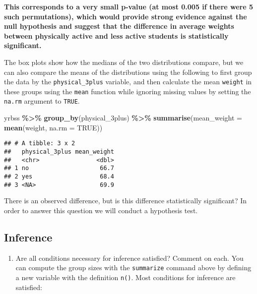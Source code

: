 \documentclass[
]{article}
\newenvironment{Shaded}{\begin{snugshade}}{\end{snugshade}}
\newcommand{\AttributeTok}[1]{\textcolor[rgb]{0.13,0.29,0.53}{#1}}
\newcommand{\ConstantTok}[1]{\textcolor[rgb]{0.56,0.35,0.01}{#1}}
\newcommand{\FunctionTok}[1]{\textcolor[rgb]{0.13,0.29,0.53}{\textbf{#1}}}
\newcommand{\NormalTok}[1]{#1}
\newcommand{\SpecialCharTok}[1]{\textcolor[rgb]{0.81,0.36,0.00}{\textbf{#1}}}
\providecommand{\tightlist}{%
  \setlength{\itemsep}{0pt}\setlength{\parskip}{0pt}}
\begin{document}
\textbf{This corresponds to a very small p-value (at most 0.005 if there
were 5 such permutations), which would provide strong evidence against
the null hypothesis and suggest that the difference in average weights
between physically active and less active students is statistically
significant.}

The box plots show how the medians of the two distributions compare, but
we can also compare the means of the distributions using the following
to first group the data by the \texttt{physical\_3plus} variable, and
then calculate the mean \texttt{weight} in these groups using the
\texttt{mean} function while ignoring missing values by setting the
\texttt{na.rm} argument to \texttt{TRUE}.

\begin{Shaded}
\begin{Highlighting}[]
\NormalTok{yrbss }\SpecialCharTok{\%\textgreater{}\%}
  \FunctionTok{group\_by}\NormalTok{(physical\_3plus) }\SpecialCharTok{\%\textgreater{}\%}
  \FunctionTok{summarise}\NormalTok{(}\AttributeTok{mean\_weight =} \FunctionTok{mean}\NormalTok{(weight, }\AttributeTok{na.rm =} \ConstantTok{TRUE}\NormalTok{))}
\end{Highlighting}
\end{Shaded}

\begin{verbatim}
## # A tibble: 3 x 2
##   physical_3plus mean_weight
##   <chr>                <dbl>
## 1 no                    66.7
## 2 yes                   68.4
## 3 <NA>                  69.9
\end{verbatim}

There is an observed difference, but is this difference statistically
significant? In order to answer this question we will conduct a
hypothesis test.

\subsection{Inference}\label{inference}

\begin{enumerate}
\def\labelenumi{\arabic{enumi}.}
\setcounter{enumi}{3}
\tightlist
\item
  Are all conditions necessary for inference satisfied? Comment on each.
  You can compute the group sizes with the \texttt{summarize} command
  above by defining a new variable with the definition \texttt{n()}.
  Most conditions for inference are satisfied:
\end{enumerate}
\end{document}
